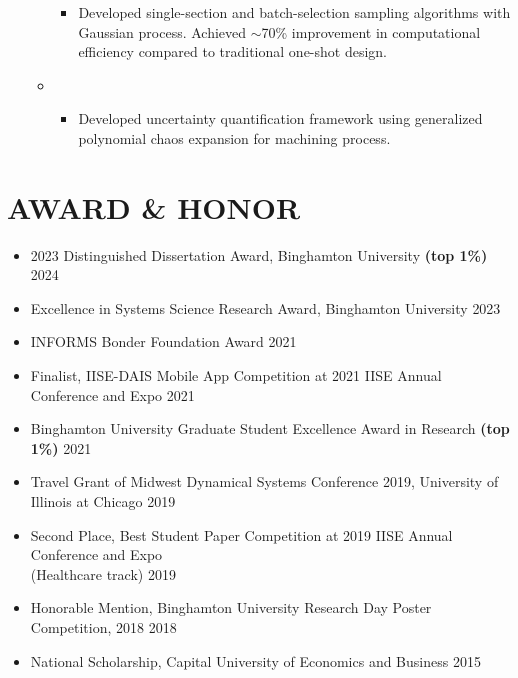 \documentclass[10pt]{article}
\begin{document}
\begin{itemize}
\begin{itemize}[label=$\bullet$]
\begin{itemize}[label=$-$]
				\item Developed single-section and batch-selection sampling algorithms with Gaussian process. Achieved $\sim$70\% improvement in computational efficiency compared to traditional one-shot design.
			\end{itemize}
	    
			\item {}
			\vspace{-0.5em}
			\begin{itemize}[label=$-$]
				\setlength\itemsep{0.5pt}
				\item Developed uncertainty quantification framework using generalized polynomial chaos expansion for machining process.
			\end{itemize}
	\end{itemize}
\end{itemize}


\vspace{-2em}
\section*{AWARD \& HONOR}
\vspace{-0.5em}
\begin{itemize}
	\setlength\itemsep{0.5pt}
	\item 2023 Distinguished Dissertation Award, Binghamton University \textbf{(top 1\%)}
	\hfill{2024}
    \item Excellence in Systems Science Research Award, Binghamton University
	\hfill{2023}
	\item INFORMS Bonder Foundation Award
	\hfill{2021}
	\item Finalist, IISE-DAIS Mobile App Competition at 2021 IISE Annual Conference and Expo
	\hfill{2021}
	\item Binghamton University Graduate Student Excellence Award in Research \textbf{(top 1\%)}
	\hfill{2021}
	\item Travel Grant of Midwest Dynamical Systems Conference 2019, University of Illinois at Chicago 
	\hfill{2019}
	\item Second Place, Best Student Paper Competition at 2019 IISE Annual Conference and Expo \\(Healthcare track)
	\hfill{2019}
	\item Honorable Mention, Binghamton University Research Day Poster Competition, 2018
	\hfill{2018}
	\item National Scholarship, Capital University of Economics and Business
	\hfill{2015}
\end{itemize}
\end{document}
